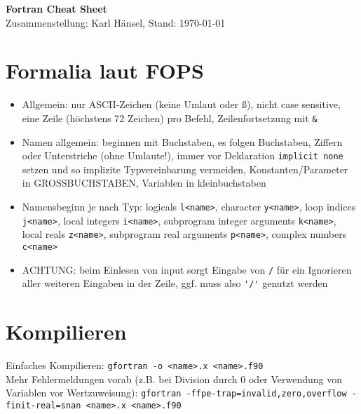 \documentclass[a4paper,10pt, twocolumn]{scrarticle}
\begin{document}
  
  {\Huge \textbf{\textsf{Fortran Cheat Sheet}}}\\
  Zusammenstellung: Karl Hänsel, Stand: \today
  \section{Formalia laut FOPS}
  \begin{itemize}
    \item Allgemein: nur ASCII-Zeichen (keine Umlaut oder ß), nicht case sensitive, eine Zeile (höchstens 72 Zeichen) pro Befehl, Zeilenfortsetzung mit \lstinline|&|
    \item Namen allgemein: beginnen mit Buchstaben, es folgen Buchstaben, Ziffern oder Unterstriche (ohne Umlaute!), immer vor Deklaration \lstinline|implicit none| setzen und so implizite Typvereinbarung vermeiden, Konstanten/Parameter in GROSSBUCHSTABEN, Variablen in kleinbuchstaben
    \item Namensbeginn je nach Typ: logicals \lstinline|l<name>|, character \lstinline|y<name>|, loop indices \lstinline|j<name>|, local integers \lstinline|i<name>|, subprogram integer arguments \lstinline|k<name>|, local reals \lstinline|z<name>|, subprogram real arguments \lstinline|p<name>|, complex numbers \lstinline|c<name>|
    \item ACHTUNG: beim Einlesen von input sorgt Eingabe von \lstinline|/| für ein Ignorieren aller weiteren Eingaben in der Zeile, ggf. muss also \lstinline|'/'| genutzt werden
  \end{itemize}
  
  \section{Kompilieren}
  Einfaches Kompilieren: \lstinline[style=neutral]|gfortran -o <name>.x <name>.f90| \\
  Mehr Fehlermeldungen vorab (z.B. bei Division durch 0 oder Verwendung von Variablen vor Wertzuweisung): \lstinline[style=neutral]|gfortran -ffpe-trap=invalid,zero,overflow -finit-real=snan <name>.x <name>.f90|
\end{document}
